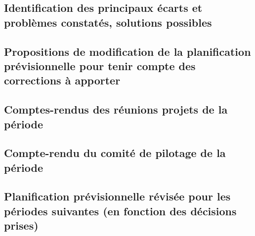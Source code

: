 \subsection{Identification des principaux écarts et problèmes constatés, solutions possibles}

\subsection{Propositions de modification de la planification prévisionnelle pour tenir compte des corrections à apporter}

\subsection{Comptes-rendus des réunions projets de la période}

\subsection{Compte-rendu du comité de pilotage de la période}

\subsection{Planification prévisionnelle révisée pour les périodes suivantes (en fonction des décisions prises)}